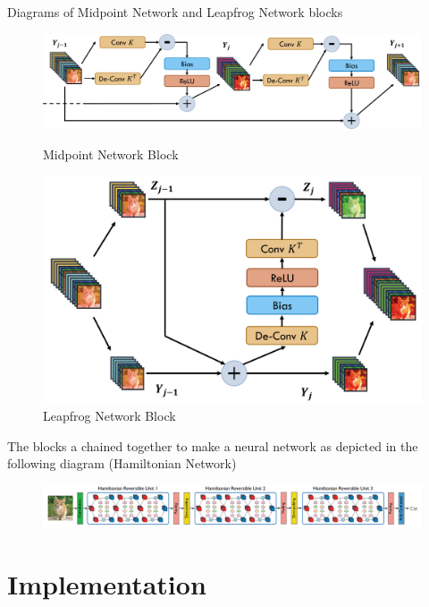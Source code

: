 \documentclass{article}
\theoremstyle{remark}
\begin{document}
Diagrams of Midpoint Network and Leapfrog Network blocks
\begin{figure}[H]
    \centering
    \begin{minipage}{0.45\textwidth}
        \centering
        \includegraphics[width=\textwidth]{imgs/midpoint_block.png} %
        \caption{Midpoint Network Block}
    \end{minipage}\hfill
    \begin{minipage}{0.45\textwidth}
        \centering
        \includegraphics[width=\textwidth]{imgs/leap_frog_block.png} %
        \caption{Leapfrog Network Block}
    \end{minipage}
\end{figure}
The blocks a chained together to make a neural network as depicted in the following diagram (Hamiltonian Network)

\begin{figure}[H]
    \centering
    \includegraphics[width=\textwidth]{imgs/hamiltonian_network.png}    
\end{figure}

\section*{Implementation}
\end{document}
